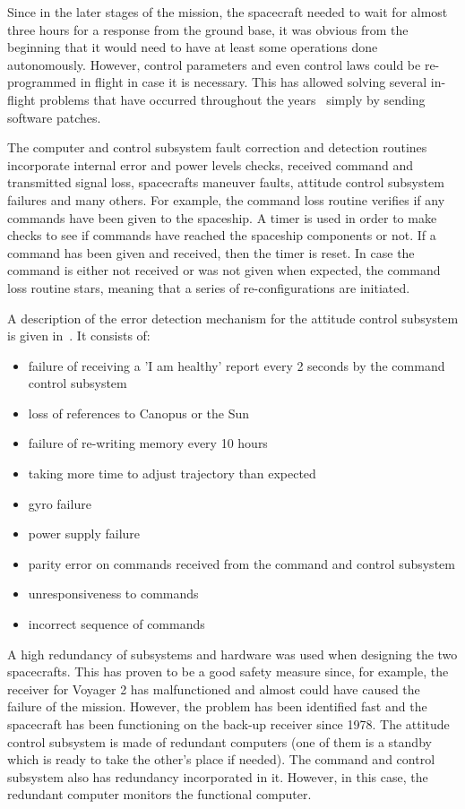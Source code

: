 Since in the later stages of the mission, the spacecraft needed to wait for
almost three hours for a response from the ground base, it was obvious from the
beginning that it would need to have at least some operations done autonomously.
However, control parameters and even control laws could be re-programmed in
flight in case it is necessary. This has allowed solving several in-flight
problems that have occurred throughout the years~\cite{litty} simply by sending
software patches.

The computer and control subsystem fault correction and detection routines
incorporate internal error and power levels checks, received command and
transmitted signal loss, spacecrafts maneuver faults, attitude control subsystem
failures and many others. For example, the command loss routine verifies if any
commands have been given to the spaceship. A timer is used in order to make
checks to see if commands have reached the spaceship components or not. If a
command has been given and received, then the timer is reset. In case the
command is either not received or was not given when expected, the command loss
routine stars, meaning that a series of re-configurations are initiated.

A description of the error detection mechanism for the attitude control subsystem
is given in~\cite{ft-space-avionics}. It consists of:
\begin{itemize}
  \item failure of receiving a 'I am healthy' report every 2 seconds by the
  command control subsystem
  \item loss of references to Canopus or the Sun
  \item failure of re-writing memory every 10 hours
  \item taking more time to adjust trajectory than expected
  \item gyro failure
  \item power supply failure
  \item parity error on commands received from the command and control subsystem
  \item unresponsiveness to commands
  \item incorrect sequence of commands
\end{itemize}

A high redundancy of subsystems and hardware was used when designing the two
spacecrafts. This has proven to be a good safety measure since, for example,
the receiver for Voyager 2 has malfunctioned and almost could have caused the
failure of the mission. However, the problem has been identified fast and the
spacecraft has been functioning on the back-up receiver since 1978. The attitude
control subsystem is made of redundant computers (one of them is a standby which
is ready to take the other's place if needed). The command and control subsystem
also has redundancy incorporated in it. However, in this case, the redundant
computer monitors the functional computer.

